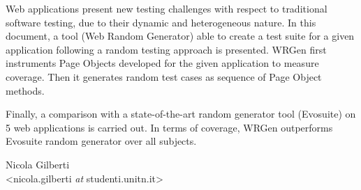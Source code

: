 Web applications present new testing challenges with respect to traditional software testing, due to their dynamic and heterogeneous nature. In this document, a tool (Web Random Generator) able to create a test suite for a given application following a random testing approach is presented. WRGen first instruments Page Objects developed for the given application to measure coverage. Then it generates random test cases as sequence of Page Object methods.

Finally, a comparison with a state-of-the-art random generator tool (Evosuite) on 5 web applications is carried out. In terms of coverage, WRGen outperforms Evosuite random generator over all subjects.

\vfill\noindent
\hfill
\begin{flushright}
\begin{minipage}[b]{0.45\textwidth}
 \centering
  Nicola Gilberti\\
 {\footnotesize <nicola.gilberti \textit{at} studenti.unitn.it>}
\end{minipage}
\end{flushright}
\newpage